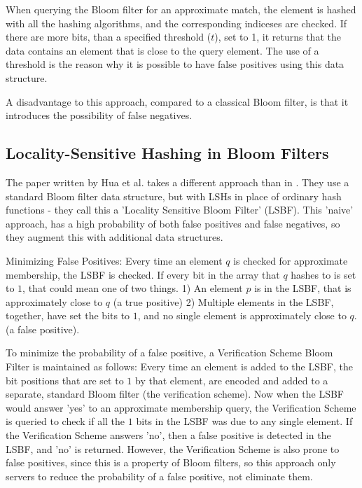 \documentclass[a4paper,11pt]{article}
\begin{document}
When querying the Bloom filter for an approximate match, the element is hashed with all the hashing algorithms, and the corresponding indiceses are checked. If there are more bits, than a specified threshold ($t$), set to 1, it returns that the data contains an element that is close to the query element. The use of a threshold is the reason why it is possible to have false positives using this data structure.

A disadvantage to this approach, compared to a classical Bloom filter, is that it introduces the possibility of false negatives.





\subsection{Locality-Sensitive Hashing in Bloom Filters}
The paper written \cite{paper:hua} by Hua et al. takes a different approach than in \cite{paper:harvard}. They use a standard Bloom filter data structure, but with LSHs in place of ordinary hash functions - they call this a 'Locality Sensitive Bloom Filter' (LSBF). This 'naive' approach, has a high probability of both false positives and false negatives, so they augment this with additional data structures.

Minimizing False Positives:
Every time an element $q$ is checked for approximate membership, the LSBF is checked. If every bit in the array that $q$ hashes to is set to $1$, that could mean one of two things.
1) An element $p$ is in the LSBF, that is approximately close to $q$ (a true positive)
2) Multiple elements in the LSBF, together, have set the bits to $1$, and no single element is approximately close to $q$. (a false positive).

To minimize the probability of a false positive, a Verification Scheme Bloom Filter is maintained as follows: Every time an element is added to the LSBF, the bit positions that are set to $1$ by that element, are encoded and added to a separate, standard Bloom filter (the verification scheme). Now when the LSBF would answer 'yes' to an approximate membership query, the Verification Scheme is queried to check if all the $1$ bits in the LSBF was due to any single element. If the Verification Scheme answers 'no', then a false positive is detected in the LSBF, and 'no' is returned. However, the Verification Scheme is also prone to false positives, since this is a property of Bloom filters, so this approach only servers to reduce the probability of a false positive, not eliminate them.
\end{document}
